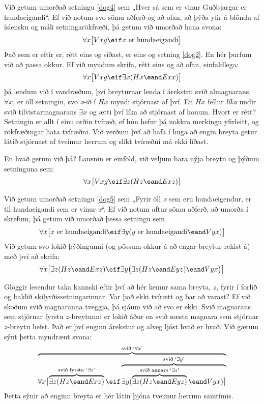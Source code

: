 Við getum umorðað setningu \ref{dog4} sem „Hver sá sem er vinur Guðbjargar er hundaeigandi“. Ef við notum svo sömu aðferð og að ofan, að þýða yfir á blöndu af íslensku og máli setningarökfræði, þá getum við umorðað hana svona: $$\forall x \bigl[Vxg \eif x \text{ er hundaeigandi}\bigr]$$ Það sem er eftir er, rétt eins og síðast, er eins og setning \ref{dog2}. En hér þurfum við að passa okkur. Ef við myndum skrifa, rétt eins og að ofan, einfaldlega: 
$$\forall x \bigl[Vxg \eif \exists x(Hx \eand Exx)\bigr]$$ þá lendum við í vandræðum, því breyturnar lenda í árekstri: svið almagnarans, $\forall x$, er öll setningin, svo \emph{x}-ið í $Hx$ myndi stjórnast af því. En $Hx$ fellur \emph{líka} undir svið tilvistarmagnarans $\exists x$ og ætti því líka að stjórnast af honum. Hvort er rétt? Setningin er allt í einu orðin tvíræð, ef hún hefur þá nokkra merkingu yfirleitt, og rökfræðingar hata tvíræðni. Við verðum því að hafa í huga að engin breyta getur látið stjórnast af tveimur herrum og slíkt tvíræðni má ekki líðast.

En hvað gerum við þá? Lausnin er einföld, við veljum bara nýja breytu og þýðum setninguna sem: $$\forall x\bigl[Vxg \eif\exists z(Hz \eand Exz)\bigr]$$ 

Við getum umorðað setningu \ref{dog5} sem „Fyrir öll \emph{x} sem eru hundaeigendur, er til hundaeigandi sem er vinur \emph{x}“. Ef við notum aftur sömu aðferð, að umorða í skrefum, þá getum við umorðað þessa setningu sem $$\forall x\bigl[\mbox{$x$ er hundaeigandi}\eif\exists y(\mbox{$y$ er hundaeigandi}\eand Vyx)\bigr]$$
Við getum svo lokið þýðingunni (og pössum okkur á að engar breytur rekist á) með því að skrifa: 
$$\forall x\bigl[\exists z(Hz \eand Exz)\eif\exists y\bigl(\exists z(Hz \eand Eyz)\eand Vyx\bigr)\bigr]$$

Glöggir lesendur taka kannski eftir því að hér kemur sama breyta, $z$, fyrir í forlið og baklið skilyrðissetningarinnar. Var það ekki tvírætt og bar að varast? Ef við skoðum svið magnaranna tveggja, þá sjáum við að svo er ekki. Svið magnarans sem stjórnar fyrstu $z$-breytunni er lokið áður en svið næsta magnara sem stjórnar $z$-breytu hefst. Það er því enginn árekstur og alveg ljóst hvað er hvað. Við gætum sýnt þetta myndrænt svona:$$\overbrace{\forall x\bigl[\overbrace{\exists z(Hz \eand Exz)}^{\text{svið fyrsta `}\exists z\text{'}}\eif \overbrace{\exists y(\overbrace{\exists z(Hz \eand Eyz)}^{\text{svið annars `}\exists z\text{'}}\eand Vyx)\bigr]}^{\text{svið `}\exists y\text{'}}}^{\text{svið `}\forall x\text{'}}$$
Þetta sýnir að enginn breyta er hér látin þjóna tveimur herrum samtímis.

